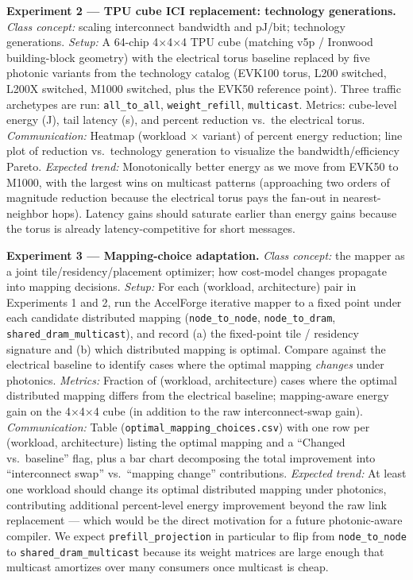 \documentclass[conference,onecolumn]{IEEEtran}
\begin{document}
\textbf{Experiment 2 --- TPU cube ICI replacement: technology generations.}
\emph{Class concept:} scaling interconnect bandwidth and pJ/bit; technology
generations.
\emph{Setup:} A 64-chip 4$\times$4$\times$4 TPU cube (matching v5p / Ironwood
building-block geometry) with the electrical torus baseline replaced by five
photonic variants from the technology catalog (EVK100 torus, L200 switched,
L200X switched, M1000 switched, plus the EVK50 reference point). Three traffic
archetypes are run: \texttt{all\_to\_all}, \texttt{weight\_refill},
\texttt{multicast}. Metrics: cube-level energy (J), tail latency (s), and
percent reduction vs.\ the electrical torus.
\emph{Communication:} Heatmap (workload $\times$ variant) of percent energy
reduction; line plot of reduction vs.\ technology generation to visualize the
bandwidth/efficiency Pareto.
\emph{Expected trend:} Monotonically better energy as we move from EVK50 to
M1000, with the largest wins on multicast patterns (approaching two orders of
magnitude reduction because the electrical torus pays the fan-out in
nearest-neighbor hops). Latency gains should saturate earlier than energy
gains because the torus is already latency-competitive for short messages.

\textbf{Experiment 3 --- Mapping-choice adaptation.}
\emph{Class concept:} the mapper as a joint tile/residency/placement
optimizer; how cost-model changes propagate into mapping decisions.
\emph{Setup:} For each (workload, architecture) pair in Experiments 1 and 2,
run the AccelForge iterative mapper to a fixed point under each candidate
distributed mapping (\texttt{node\_to\_node}, \texttt{node\_to\_dram},
\texttt{shared\_dram\_multicast}), and record (a) the fixed-point tile /
residency signature and (b) which distributed mapping is optimal. Compare
against the electrical baseline to identify cases where the optimal mapping
\emph{changes} under photonics.
\emph{Metrics:} Fraction of (workload, architecture) cases where the optimal
distributed mapping differs from the electrical baseline; mapping-aware
energy gain on the 4$\times$4$\times$4 cube (in addition to the raw
interconnect-swap gain).
\emph{Communication:} Table (\texttt{optimal\_mapping\_choices.csv}) with one
row per (workload, architecture) listing the optimal mapping and a
``Changed vs.\ baseline'' flag, plus a bar chart decomposing the total
improvement into ``interconnect swap'' vs.\ ``mapping change'' contributions.
\emph{Expected trend:} At least one workload should change its optimal
distributed mapping under photonics, contributing additional percent-level
energy improvement beyond the raw link replacement --- which would be the
direct motivation for a future photonic-aware compiler. We expect
\texttt{prefill\_projection} in particular to flip from \texttt{node\_to\_node}
to \texttt{shared\_dram\_multicast} because its weight matrices are large
enough that multicast amortizes over many consumers once multicast is cheap.
\end{document}

